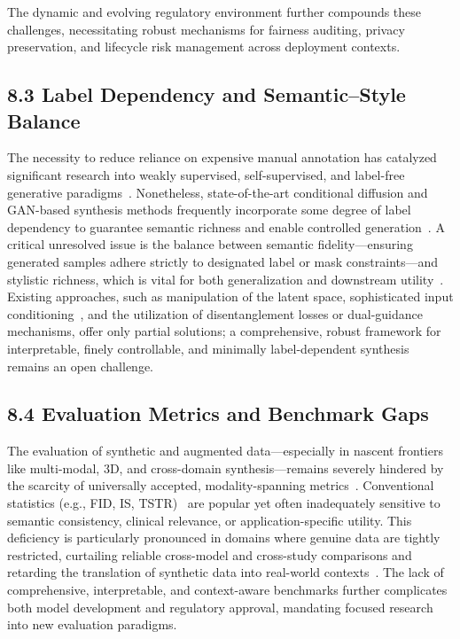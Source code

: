 \documentclass[11pt]{article}
\begin{document}
The dynamic and evolving regulatory environment further compounds these challenges, necessitating robust mechanisms for fairness auditing, privacy preservation, and lifecycle risk management across deployment contexts.

\subsection{8.3 Label Dependency and Semantic–Style Balance}

The necessity to reduce reliance on expensive manual annotation has catalyzed significant research into weakly supervised, self-supervised, and label-free generative paradigms~\cite{101,102}. Nonetheless, state-of-the-art conditional diffusion and GAN-based synthesis methods frequently incorporate some degree of label dependency to guarantee semantic richness and enable controlled generation~\cite{101,102}. A critical unresolved issue is the balance between semantic fidelity—ensuring generated samples adhere strictly to designated label or mask constraints—and stylistic richness, which is vital for both generalization and downstream utility~\cite{102}. Existing approaches, such as manipulation of the latent space, sophisticated input conditioning~\cite{89,101}, and the utilization of disentanglement losses or dual-guidance mechanisms, offer only partial solutions; a comprehensive, robust framework for interpretable, finely controllable, and minimally label-dependent synthesis remains an open challenge.

\subsection{8.4 Evaluation Metrics and Benchmark Gaps}

The evaluation of synthetic and augmented data—especially in nascent frontiers like multi-modal, 3D, and cross-domain synthesis—remains severely hindered by the scarcity of universally accepted, modality-spanning metrics~\cite{35,52,53,81,89,91}. Conventional statistics (e.g., FID, IS, TSTR)~\cite{35,52,53} are popular yet often inadequately sensitive to semantic consistency, clinical relevance, or application-specific utility. This deficiency is particularly pronounced in domains where genuine data are tightly restricted, curtailing reliable cross-model and cross-study comparisons and retarding the translation of synthetic data into real-world contexts~\cite{81,89,91}. The lack of comprehensive, interpretable, and context-aware benchmarks further complicates both model development and regulatory approval, mandating focused research into new evaluation paradigms.
\end{document}
